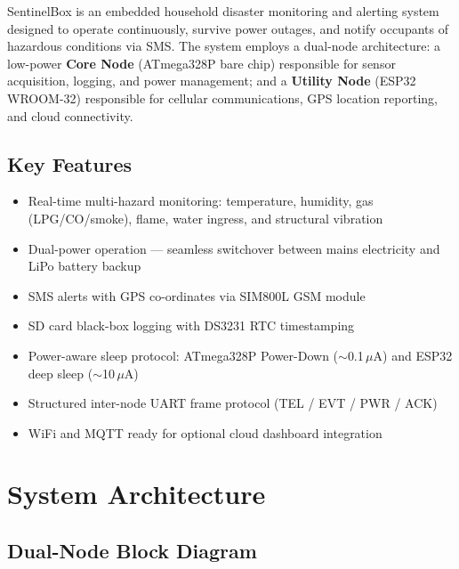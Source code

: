 \documentclass[12pt,a4paper]{article}
\begin{document}
SentinelBox is an embedded household disaster monitoring and alerting system
designed to operate continuously, survive power outages, and notify occupants
of hazardous conditions via SMS\@. The system employs a dual-node architecture:
a low-power \textbf{Core Node} (ATmega328P bare chip) responsible for sensor
acquisition, logging, and power management; and a \textbf{Utility Node}
(ESP32 WROOM-32) responsible for cellular communications, GPS location
reporting, and cloud connectivity.

\subsection{Key Features}
\begin{itemize}
  \item Real-time multi-hazard monitoring: temperature, humidity, gas
        (LPG/CO/smoke), flame, water ingress, and structural vibration
  \item Dual-power operation --- seamless switchover between mains electricity
        and LiPo battery backup
  \item SMS alerts with GPS co-ordinates via SIM800L GSM module
  \item SD card black-box logging with DS3231 RTC timestamping
  \item Power-aware sleep protocol: ATmega328P Power-Down ($\sim$0.1\,$\mu$A)
        and ESP32 deep sleep ($\sim$10\,$\mu$A)
  \item Structured inter-node UART frame protocol (TEL / EVT / PWR / ACK)
  \item WiFi and MQTT ready for optional cloud dashboard integration
\end{itemize}

\section{System Architecture}

\subsection{Dual-Node Block Diagram}
\end{document}
